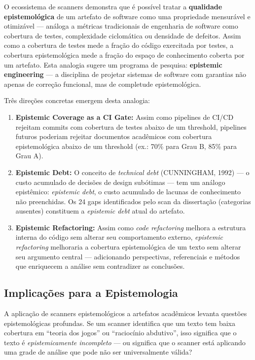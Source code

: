 O ecossistema de scanners demonstra que é possível tratar a \textbf{qualidade epistemológica} de um artefato de software como uma propriedade mensurável e otimizável --- análoga a métricas tradicionais de engenharia de software como cobertura de testes, complexidade ciclomática ou densidade de defeitos. Assim como a cobertura de testes mede a fração do código exercitada por testes, a cobertura epistemológica mede a fração do espaço de conhecimento coberta por um artefato. Esta analogia sugere um programa de pesquisa: \textbf{epistemic engineering} --- a disciplina de projetar sistemas de software com garantias não apenas de correção funcional, mas de completude epistemológica.

Três direções concretas emergem desta analogia:

\begin{enumerate}
  \item \textbf{Epistemic Coverage as a CI Gate:} Assim como pipelines de CI/CD rejeitam commits com cobertura de testes abaixo de um threshold, pipelines futuros poderiam rejeitar documentos acadêmicos com cobertura epistemológica abaixo de um threshold (ex.: 70\% para Grau B, 85\% para Grau A).
  \item \textbf{Epistemic Debt:} O conceito de \textit{technical debt} (CUNNINGHAM, 1992) --- o custo acumulado de decisões de design subótimas --- tem um análogo epistêmico: \textit{epistemic debt}, o custo acumulado de lacunas de conhecimento não preenchidas. Os 24 gaps identificados pelo scan da dissertação (categorias ausentes) constituem a \textit{epistemic debt} atual do artefato.
  \item \textbf{Epistemic Refactoring:} Assim como \textit{code refactoring} melhora a estrutura interna do código sem alterar seu comportamento externo, \textit{epistemic refactoring} melhoraria a cobertura epistemológica de um texto sem alterar seu argumento central --- adicionando perspectivas, referenciais e métodos que enriquecem a análise sem contradizer as conclusões.
\end{enumerate}

\subsection{Implicações para a Epistemologia}

A aplicação de scanners epistemológicos a artefatos acadêmicos levanta questões epistemológicas profundas. Se um scanner identifica que um texto tem baixa cobertura em ``teoria dos jogos'' ou ``raciocínio abdutivo'', isso significa que o texto é \textit{epistemicamente incompleto} --- ou significa que o scanner está aplicando uma grade de análise que pode não ser universalmente válida?

